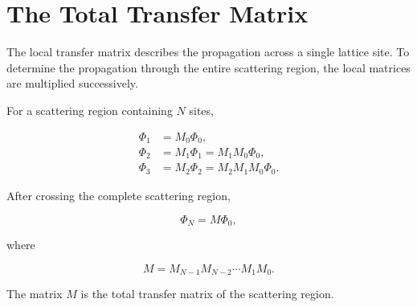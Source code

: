 
\section{The Total Transfer Matrix}

The local transfer matrix describes the propagation across a single
lattice site. To determine the propagation through the entire scattering
region, the local matrices are multiplied successively.

For a scattering region containing $N$ sites,

\begin{align}
	\Phi_1 & = M_0\Phi_0, \\
	\Phi_2 & = M_1\Phi_1
	= M_1M_0\Phi_0,       \\
	\Phi_3 & = M_2\Phi_2
	= M_2M_1M_0\Phi_0.
\end{align}

After crossing the complete scattering region,

\begin{equation}
	\Phi_N
	=
	M
	\Phi_0,
	\label{eq:total-transfer}
\end{equation}

where

\begin{equation}
	M
	=
	M_{N-1}
	M_{N-2}
	\cdots
	M_1
	M_0.
	\label{eq:total-transfer-matrix}
\end{equation}

The matrix $M$ is the total transfer matrix of the scattering region.

\begin{center}
\end{center}


